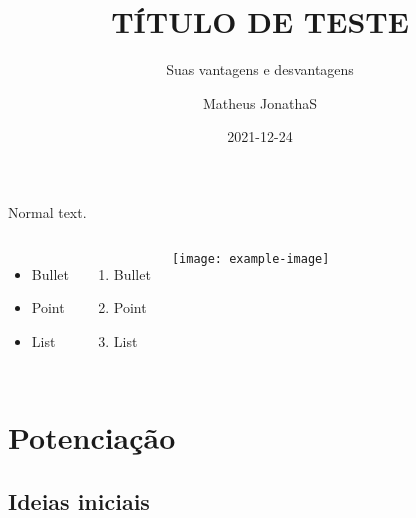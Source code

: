 \documentclass[aspectratio=169,11pt]{if-beamer}
\title[Matheus Jonatha]{TÍTULO DE TESTE}
\subtitle{Suas vantagens e desvantagens}
\author[\today]{Matheus JonathaS}
\date{2021-12-24}
\institute[IFRN]{Instituto Federal do RN}
\begin{document}
\logopage

\titlepage

\begin{frame}
    \tableofcontents
\end{frame}



\begin{frame}
    Normal text.

    \begin{columns}
        \begin{itemize}
        \item Bullet
        \item Point
        \item List
        \end{itemize}
        \begin{enumerate}
        \item Bullet
        \item Point
        \item List
        \end{enumerate}
        

        \texttt{[image: example-image]}
      \end{columns}
    
\end{frame}



\section{Potenciação}
    \subsection{Ideias iniciais}
    
\end{document}
